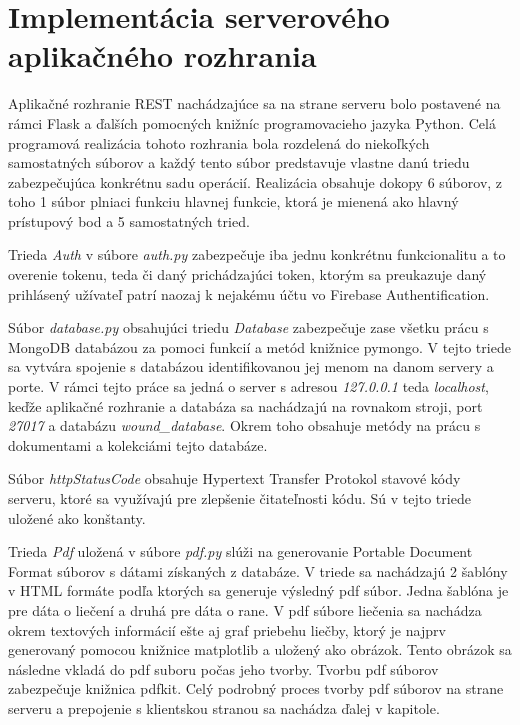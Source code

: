 \section{Implementácia serverového aplikačného rozhrania}
Aplikačné rozhranie REST nachádzajúce sa na strane serveru bolo postavené na rámci Flask a ďalších pomocných knižníc programovacieho jazyka Python. Celá programová realizácia tohoto rozhrania bola rozdelená do niekoľkých samostatných súborov a každý tento súbor predstavuje vlastne danú triedu zabezpečujúca konkrétnu sadu operácií. Realizácia obsahuje dokopy 6 súborov, z toho 1 súbor plniaci funkciu hlavnej funkcie, ktorá je mienená ako hlavný prístupový bod a 5 samostatných tried.

Trieda \textit{Auth} v súbore \textit{auth.py} zabezpečuje iba jednu konkrétnu funkcionalitu a to overenie tokenu, teda či daný prichádzajúci token, ktorým sa preukazuje daný prihlásený užívateľ patrí naozaj k nejakému účtu vo Firebase Authentification.

Súbor \textit{database.py} obsahujúci triedu \textit{Database} zabezpečuje zase všetku prácu s MongoDB databázou za pomoci funkcií a metód knižnice pymongo. V tejto triede sa vytvára spojenie s databázou identifikovanou jej menom na danom servery a porte. V rámci tejto práce sa jedná o server s adresou \textit{127.0.0.1} teda \textit{localhost}, keďže aplikačné rozhranie a databáza sa nachádzajú na rovnakom stroji, port \textit{27017} a databázu \textit{wound\_database}. Okrem toho obsahuje metódy na prácu s dokumentami a kolekciámi tejto databáze.

Súbor \textit{httpStatusCode} obsahuje Hypertext Transfer Protokol stavové kódy serveru, ktoré sa využívajú pre zlepšenie čitateľnosti kódu. Sú v tejto triede uložené ako konštanty.

Trieda \textit{Pdf} uložená v súbore \textit{pdf.py} slúži na generovanie Portable Document Format súborov s dátami získaných z databáze. V triede sa nachádzajú 2 šablóny v HTML  formáte podľa ktorých sa generuje výsledný pdf súbor. Jedna šablóna je pre dáta o liečení a druhá pre dáta o rane. V pdf súbore liečenia sa nachádza okrem textových informácií ešte aj graf priebehu liečby, ktorý je najprv generovaný pomocou knižnice matplotlib a uložený ako obrázok. Tento obrázok sa následne vkladá do pdf suboru počas jeho tvorby. Tvorbu pdf súborov zabezpečuje knižnica pdfkit. Celý podrobný proces tvorby pdf súborov na strane serveru a prepojenie s klientskou stranou sa nachádza ďalej v kapitole.

